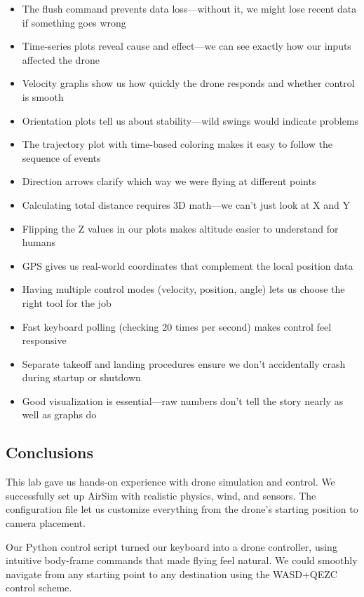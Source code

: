 \begin{itemize}
	\item The flush command prevents data loss—without it, we might lose recent data if something goes wrong
	\item Time-series plots reveal cause and effect—we can see exactly how our inputs affected the drone
	\item Velocity graphs show us how quickly the drone responds and whether control is smooth
	\item Orientation plots tell us about stability—wild swings would indicate problems
	\item The trajectory plot with time-based coloring makes it easy to follow the sequence of events
	\item Direction arrows clarify which way we were flying at different points
	\item Calculating total distance requires 3D math—we can't just look at X and Y
	\item Flipping the Z values in our plots makes altitude easier to understand for humans
	\item GPS gives us real-world coordinates that complement the local position data
	\item Having multiple control modes (velocity, position, angle) lets us choose the right tool for the job
	\item Fast keyboard polling (checking 20 times per second) makes control feel responsive
	\item Separate takeoff and landing procedures ensure we don't accidentally crash during startup or shutdown
	\item Good visualization is essential—raw numbers don't tell the story nearly as well as graphs do
\end{itemize}

\subsection{Conclusions}

This lab gave us hands-on experience with drone simulation and control. We successfully set up AirSim with realistic physics, wind, and sensors. The configuration file let us customize everything from the drone's starting position to camera placement.

Our Python control script turned our keyboard into a drone controller, using intuitive body-frame commands that made flying feel natural. We could smoothly navigate from any starting point to any destination using the WASD+QEZC control scheme.

